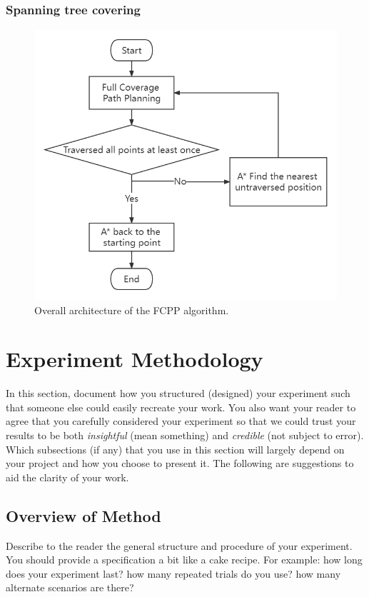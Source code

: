 \documentclass[conference]{IEEEtran}
\begin{document}
\subsubsection{Spanning tree covering}
\begin{figure}[htbp]
\centerline{\includegraphics[scale=0.35]{RS_Report/RS_Report (1).png}}
\caption{Overall architecture of the FCPP algorithm.}
\label{fig4}
\end{figure}


\section{Experiment Methodology}

In this section, document how you structured (designed) your experiment such that someone else could easily recreate your work.  You also want your reader to agree that you carefully considered your experiment so that we could trust your results to be both \emph{insightful} (mean something) and \emph{credible} (not subject to error).  Which subsections (if any) that you use in this section will largely depend on your project and how you choose to present it.  The following are suggestions to aid the clarity of your work.

\subsection{Overview of Method}
Describe to the reader the general structure and procedure of your experiment. You should provide a specification a bit like a cake recipe.  For example: how long does your experiment last?  how many repeated trials do you use?  how many alternate scenarios are there?
\end{document}
